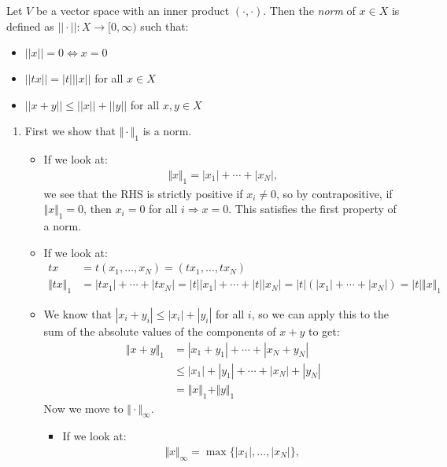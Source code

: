 \documentclass{article}%
\begin{document}
\begin{enumerate}
    Let $V$ be a vector space with an inner product $(\cdot, \cdot)$. Then the \emph{norm} of $x \in X$ is defined as $||\cdot||: X \to [0, \infty)$ such that:
    \begin{itemize}
        \item $||x|| = 0 \iff x = 0$
        \item $||tx|| = |t|||x||$ for all $x \in X$
        \item $||x + y|| \leq ||x|| + ||y||$ for all $x, y \in X$
    \end{itemize}
    \begin{enumerate}
        \item First we show that $\Vert\cdot\Vert_{1}$ is a norm.
        \begin{itemize}
            \item If we look at:
            \begin{align*}
                \Vert x \Vert_1 = |x_1| + \cdots + |x_N|,
            \end{align*}
            we see that the RHS is strictly positive if $x_i \neq 0$, so by contrapositive, if $\Vert x \Vert_1 = 0$, then $x_i = 0$ for all $i \Rightarrow x = 0$. This satisfies the first property of a norm.
            \item If we look at:
            \begin{align*}
                tx &= t(x_1, \ldots, x_N) = (tx_1, \ldots, tx_N)\\
                \Vert tx \Vert_1 &= |tx_1| + \cdots + |tx_N| = |t||x_1| + \cdots + |t||x_N| = |t|(|x_1| + \cdots + |x_N|) = |t|\Vert x \Vert_1
            \end{align*}
            \item We know that $|x_i + y_i| \leq |x_i| + |y_i|$ for all $i$, so we can apply this to the sum of the absolute values of the components of $x + y$ to get:
            \begin{align*}
                \Vert x + y \Vert_1 &= |x_1 + y_1| + \cdots + |x_N + y_N|\\
                &\leq |x_1| + |y_1| + \cdots + |x_N| + |y_N|\\
                &= \Vert x \Vert_1 + \Vert y \Vert_1
            \end{align*}
            Now we move to $\Vert\cdot\Vert_{\infty}$.
            \begin{itemize}
                \item If we look at:
                \begin{align*}
                    \Vert x \Vert_{\infty} = \max\{|x_1|, \ldots, |x_N|\},

\end{align*}
\end{itemize}
\end{itemize}
\end{enumerate}
\end{enumerate}
\end{document}
